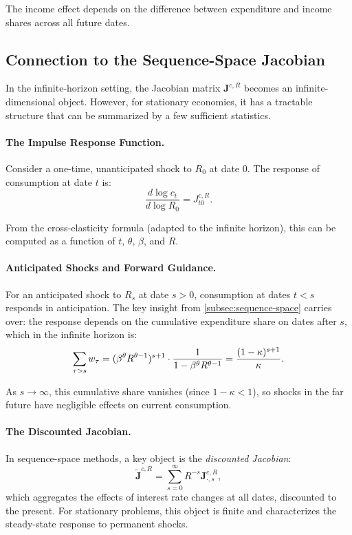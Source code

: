 The income effect depends on the difference between expenditure and income shares across all future dates.

\subsection{Connection to the Sequence-Space Jacobian}
\label{subsec:infinite-jacobian}

In the infinite-horizon setting, the Jacobian matrix $\mathbf{J}^{c,R}$ becomes an infinite-dimensional object. However, for stationary economies, it has a tractable structure that can be summarized by a few sufficient statistics.

\paragraph{The Impulse Response Function.}
Consider a one-time, unanticipated shock to $R_0$ at date 0. The response of consumption at date $t$ is:
\begin{equation}
\frac{d \log c_t}{d \log R_0} = J^{c,R}_{t0}.
\label{eq:irf-def}
\end{equation}

From the cross-elasticity formula (adapted to the infinite horizon), this can be computed as a function of $t$, $\theta$, $\beta$, and $R$.

\paragraph{Anticipated Shocks and Forward Guidance.}
For an anticipated shock to $R_s$ at date $s > 0$, consumption at dates $t < s$ responds in anticipation. The key insight from \cref{subsec:sequence-space} carries over: the response depends on the cumulative expenditure share on dates after $s$, which in the infinite horizon is:
\begin{equation}
\sum_{\tau > s} w_\tau = (\beta^\theta R^{\theta - 1})^{s+1} \cdot \frac{1}{1 - \beta^\theta R^{\theta - 1}} = \frac{(1-\kappa)^{s+1}}{\kappa}.
\label{eq:cumulative-share-infinity}
\end{equation}

As $s \to \infty$, this cumulative share vanishes (since $1 - \kappa < 1$), so shocks in the far future have negligible effects on current consumption.

\paragraph{The Discounted Jacobian.}
In sequence-space methods, a key object is the \emph{discounted Jacobian}:
\begin{equation}
\tilde{\mathbf{J}}^{c,R} = \sum_{s=0}^{\infty} R^{-s} \mathbf{J}^{c,R}_{\cdot, s},
\label{eq:discounted-jacobian}
\end{equation}
which aggregates the effects of interest rate changes at all dates, discounted to the present. For stationary problems, this object is finite and characterizes the steady-state response to permanent shocks.

